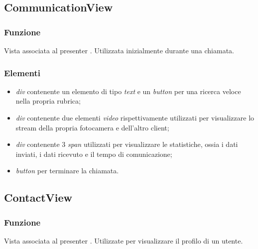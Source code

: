 \subsection{CommunicationView}
\subsubsection*{Funzione}
Vista associata al presenter . Utilizzata inizialmente durante una chiamata.
\subsubsection*{Elementi}
\begin{itemize}
\item \textit{div} contenente un elemento di tipo \textit{text} e un \textit{button} per una ricerca veloce nella propria rubrica;
\item \textit{div} contenente due elementi \textit{video} rispettivamente utilizzati per visualizzare lo stream della propria fotocamera e dell'altro client;
\item \textit{div} contenente 3 \textit{span} utilizzati per visualizzare le statistiche, ossia i dati inviati, i dati ricevuto e il tempo di comunicazione;
\item \textit{button} per terminare la chiamata.
\end{itemize}

\subsection{ContactView}
\subsubsection*{Funzione}
Vista associata al presenter . Utilizzate per visualizzare il profilo di un utente.
